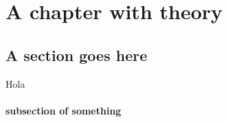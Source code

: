 \chapter{A chapter with theory}

\lipsum[1-2]

\section{A section goes here}

Hola \cite{afad2006}
\lipsum[1-3]

\subsubsection{subsection of something}

\lipsum[1-2]